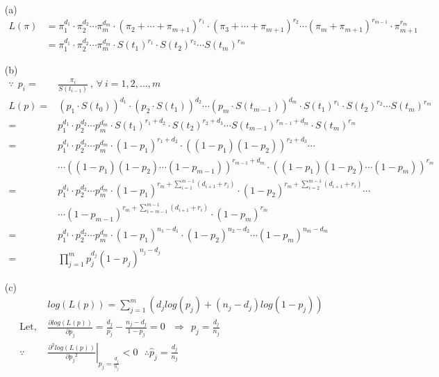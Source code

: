 \documentclass[paper=a4, fontsize=11pt]{scrartcl} %
\numberwithin{equation}{section} %
\numberwithin{figure}{section} %
\numberwithin{table}{section} %
\begin{document}
\begin{itemize}
	\item[(a)]{
		\begin{align*}
			L(\pi)	&=	\pi_{1}^{d_1}\cdot\pi_{2}^{d_2}\cdots\pi_{m}^{d_m}\cdot(\pi_2+\cdots+\pi_{m+1})^{r_1}\cdot(\pi_3+\cdots+\pi_{m+1})^{r_2}\cdots(\pi_m+\pi_{m+1})^{r_{m-1}}\cdot\pi_{m+1}^{r_m}\\
				&=	\pi_{1}^{d_1}\cdot\pi_{2}^{d_2}\cdots\pi_{m}^{d_m}\cdot S(t_1)^{r_1}\cdot S(t_2)^{r_2}\cdots S(t_m)^{r_m}
		\end{align*}
	}
	
	\item[(b)]{
		\begin{align*}
			\because\ \ p_i 	=& 	\frac{\pi_i}{S(t_{i-1})}\ \text{, } \forall \ i = 1, 2, \dots, m \\
			L(p)			=&	\left( p_1\cdot S(t_{0})\right)^{d_{1}}\cdot\left( p_2\cdot S(t_{1})\right)^{d_{2}}\cdots\left( p_m\cdot S(t_{m-1})\right)^{d_{m}}\cdot S(t_1)^{r_1}\cdot S(t_2)^{r_2}\cdots S(t_m)^{r_m}\\
						=&	p_{1}^{d_{1}}\cdot p_{2}^{d_{2}}\cdots p_{m}^{d_{m}}\cdot  S(t_1)^{r_1+d_2}\cdot S(t_2)^{r_2+d_3}\cdots S(t_{m-1})^{r_{m-1}+d_m}\cdot S(t_m)^{r_m}\\
						=&	p_{1}^{d_{1}}\cdot p_{2}^{d_{2}}\cdots p_{m}^{d_{m}}\cdot (1-p_1)^{r_1+d_2}\cdot \left((1-p_1)(1-p_2) \right)^{r_2+d_3}\cdots \\
						  & \cdots \left((1-p_1)(1-p_2)\cdots(1-p_{m-1}) \right)^{r_{m-1}+d_m}\cdot   \left((1-p_1)(1-p_2)\cdots(1-p_{m}) \right)^{r_m} \\
						=&	p_{1}^{d_{1}}\cdot p_{2}^{d_{2}}\cdots p_{m}^{d_{m}}\cdot (1-p_1)^{r_m+\sum_{i = 1}^{m-1}(d_{i+1}+r_i)}\cdot (1-p_2)^{r_m+\sum_{i = 2}^{m-1}(d_{i+1}+r_i)}\cdots \\
						  &	\cdots(1-p_{m-1})^{r_m+\sum_{i = {m-1}}^{m-1}(d_{i+1}+r_i)}\cdot(1-p_m)^{r_m}\\
						=& 	p_{1}^{d_{1}}\cdot p_{2}^{d_{2}}\cdots p_{m}^{d_{m}}\cdot (1-p_1)^{n_1-d_1}\cdot (1-p_2)^{n_2-d_2}\cdots (1-p_m)^{n_m-d_m}\\
						=&	\prod_{j=1}^mp_j^{d_j}(1-p_j)^{n_j-d_j}
		\end{align*}
	}
	
	\item[(c)]{
		\begin{align*}
				&log\left( L(p) \right) = \sum_{j=1}^m\left( d_jlog(p_j)+(n_j-d_j)log(1-p_j)\right)\\
	\text{Let,\ \ \ }&\frac{\partial log\left( L(p) \right)}{\partial p_j} =\frac{d_j}{p_j} - \frac{n_j-d_j}{1-p_j}=0\ \ \ \Rightarrow\ \  p_j = \frac{d_j}{n_j}\\
	\because\ \   &	\left. \frac{\partial^2 log\left( L(p) \right)}{\partial {p_j}^2} \right |_{p_j = \frac{d_j}{n_j}} <0 \text{\ \ \ \ \ \ }\therefore \widehat{p}_j = \frac{d_j}{n_j}
		\end{align*}
	}
	

\end{itemize}
\end{document}
